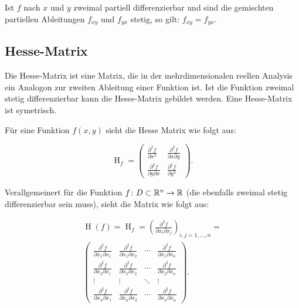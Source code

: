 \begin{satz}
Ist $f$ nach $x$ und $y$ zweimal partiell differenzierbar und sind die gemischten
partiellen Ableitungen $f_{xy}$ und $f_{yx}$ stetig, so gilt: $f_{xy} = f_{yx}$.
\end{satz}

\subsection{Hesse-Matrix}
Die Hesse-Matrix ist eine Matrix, die in der mehrdimensionalen reellen Analysis ein Analogon zur zweiten Ableitung einer Funktion ist. Ist die Funktion zweimal stetig differenzierbar kann die Hesse-Matrix gebildet werden. Eine Hesse-Matrix ist symetrisch.

Für eine Funktion $f(x,y)$ sieht die Hesse Matrix wie folgt aus:

$$\operatorname{H}_f=
\begin{pmatrix}
\frac{\partial^2 f}{\partial x^2}&\frac{\partial^2 f}{\partial x\partial y}\\
\frac{\partial^2 f}{\partial y\partial x}&\frac{\partial^2 f}{\partial y^2}
\end{pmatrix}.$$

Verallgemeinert für die Funktion $f \colon D \subset \mathbb{R}^n \to \mathbb{R}$  (die ebenfalls zweimal stetig differenzierbar sein muss), sieht die Matrix wie folgt aus:

\begin{equation}\begin{split}\operatorname{H}(f)=\operatorname{H}_f=
\left(\frac{\partial^2f}{\partial x_i\partial x_j}\right)_{i,j=1,\dots, n}= \\
\begin{pmatrix}
\frac{\partial^2 f}{\partial x_1\partial x_1}&\frac{\partial^2 f}{\partial x_1\partial x_2}&\cdots&\frac{\partial^2  f}{\partial x_1\partial x_n}\\[0.5em]
\frac{\partial^2 f}{\partial x_2\partial x_1}&\frac{\partial^2 f}{\partial x_2\partial x_2}&\cdots&\frac{\partial^2  f}{\partial x_2\partial x_n}\\
\vdots&\vdots&\ddots&\vdots\\
\frac{\partial^2 f}{\partial x_n\partial x_1}&\frac{\partial^2 f}{\partial x_n\partial x_2}&\cdots&\frac{\partial^2  f}{\partial x_n\partial x_n}
\end{pmatrix}.\end{split}\end{equation}


